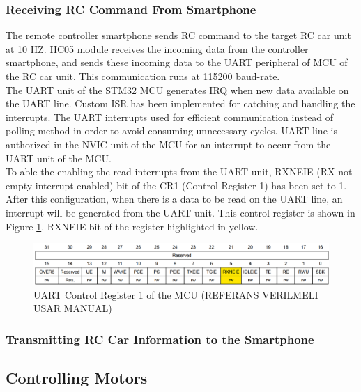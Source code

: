 \subsubsection{Receiving RC Command From Smartphone} \label{sec_receive_rc_command}

The remote controller smartphone sends RC command to the target RC car unit at 10 HZ. HC05 module receives the incoming data from the controller smartphone, and sends these incoming data to the UART peripheral of MCU of the RC car unit. This communication runs at 115200 baud-rate. \\

The UART unit of the STM32 MCU generates IRQ when new data available on the UART line. Custom ISR has been implemented for catching and handling the interrupts. The UART interrupts used for efficient communication instead of polling method in order to avoid consuming unnecessary cycles. UART line is authorized in the NVIC unit of the MCU for an interrupt to occur from the UART unit of the MCU. \\

To able the enabling the read interrupts from the UART unit, RXNEIE (RX not empty interrupt enabled) bit of the CR1 (Control Register 1) has been set to 1. After this configuration, when there is a data to be read on the UART line, an interrupt will be generated from the UART unit. This control register is shown in Figure \ref{fig:uart_cr_register}. RXNEIE bit of the register highlighted in yellow.

\begin{figure}[!htbp]
    \centering
    \includegraphics[width=1\textwidth]{Imgs/cr_register.png}
    \caption{\label{fig:uart_cr_register}UART Control Register 1 of the MCU (REFERANS VERILMELI USAR MANUAL)}
\end{figure}



\subsubsection{Transmitting RC Car Information to the Smartphone}
\label{sec_transmit_rc_info}


\subsection{Controlling Motors} \label{sec_controlling_motors}

